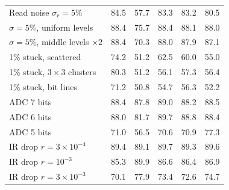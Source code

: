 \begin{table}[h!]
\begin{minipage}[t]{0.48\textwidth}
\begin{tabular}{@{}lccccc@{}}
Read noise $\sigma_r=5\%$ & 84.5 & 57.7 & 83.3 & 83.2 & 80.5 \\
$\sigma=5\%$, uniform levels & 88.4 & 75.7 & 88.4 & 88.1 & 88.0 \\
$\sigma=5\%$, middle levels $\times2$ & 88.4 & 70.3 & 88.0 & 87.9 & 87.1 \\
\midrule
1\% stuck, scattered & 74.2 & 51.2 & 62.5 & 60.0 & 55.0 \\
1\% stuck, $3\times3$ clusters & 80.3 & 51.2 & 56.1 & 57.3 & 56.4 \\
1\% stuck, bit lines & 71.2 & 50.8 & 54.7 & 56.3 & 52.2 \\
\midrule
ADC 7 bits & 88.4 & 87.8 & 89.0 & 88.2 & 88.5 \\
ADC 6 bits & 88.0 & 81.7 & 89.7 & 88.8 & 88.4 \\
ADC 5 bits & 71.0 & 56.5 & 70.6 & 70.9 & 77.3 \\
\midrule
IR drop $r=3\times10^{-4}$ & 89.4 & 89.1 & 89.7 & 89.3 & 89.6 \\
IR drop $r=10^{-3}$ & 85.3 & 89.9 & 86.6 & 86.4 & 86.9 \\
IR drop $r=3\times10^{-3}$ & 70.1 & 77.9 & 73.4 & 72.6 & 74.7 \\
\bottomrule
\end{tabular}
\end{minipage}
\end{table}

